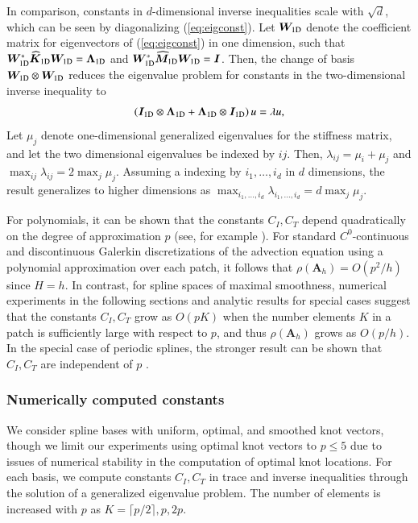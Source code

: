 \documentclass[preprint,10pt]{elsarticle}
\newcommand{\LRp}[1]{\left( #1 \right)}
\newcommand{\reviewerOne}[1]{#1}
\begin{document}
In comparison, constants in $d$-dimensional inverse inequalities scale with $\sqrt{d}$, which can be seen by diagonalizing (\ref{eq:eigconst}).  Let $\bm{W}_{\rm 1D}$ denote the coefficient matrix for eigenvectors of (\ref{eq:eigconst}) in one dimension, such that $\bm{W}_{\rm 1D}^* \widehat{\bm{K}}_{\rm 1D} \bm{W}_{\rm 1D} = \bm{\Lambda}_{\rm 1D}$ and $\bm{W}_{\rm 1D}^* \widehat{\bm{M}}_{\rm 1D} \bm{W}_{\rm 1D} = \bm{I}$.  Then, the change of basis $\bm{W}_{\rm 1D}\otimes \bm{W}_{\rm 1D}$ reduces the eigenvalue problem for constants in the two-dimensional inverse inequality to 
\[
\LRp{\bm{I}_{\rm 1D}\otimes \bm{\Lambda}_{\rm 1D} + \bm{\Lambda}_{\rm 1D}\otimes\bm{I}_{\rm 1D}} u = \lambda u,
\]
Let $\mu_j$ denote one-dimensional generalized eigenvalues for the stiffness matrix, and let the two dimensional eigenvalues be indexed by $ij$.  Then, $\lambda_{ij} = \mu_i + \mu_j$ and $\max_{ij} \lambda_{ij} = 2\max_j \mu_j$.  Assuming a indexing by $i_1, \ldots, i_d$ in $d$ dimensions, the result generalizes to higher dimensions as $\max_{i_1,\ldots,i_d} \lambda_{i_1,\ldots,i_d} = d\max_j \mu_j$.  

For polynomials, it can be shown that the constants $C_I,C_T$ depend quadratically on the degree of approximation $p$ (see, for example \cite{warburton2003constants, ozisik2010constants,hillewaert2011sharp}).  For standard $C^0$-continuous {\color{forestgreen} and discontinuous Galerkin discretizations} of the advection equation {\color{forestgreen} using a polynomial approximation over each patch}, it follows that $\rho(\bm{A}_h) = O(p^2 / h)$ {\color{forestgreen} since $H = h$}.  {\color{forestgreen} In contrast, for spline spaces of maximal smoothness, numerical experiments in the following sections and analytic results for special cases \cite{takacs2016approximation} suggest that the constants $C_I, C_T$ grow as $O(pK)$ when the number elements $K$ in a patch is sufficiently large with respect to $p$, and thus $\rho(\bm{A}_h)$ grows as $O(p / h)$.}  In the special case of periodic splines, the stronger result can be shown that $C_I, C_T$ are independent of $p$ \cite{takacs2016approximation}.  

\subsubsection{Numerically computed constants}
\label{sec:numconsts}

We consider spline bases with uniform, optimal, and smoothed knot vectors, though we limit our experiments using optimal knot vectors to $p \leq 5$ due to issues of numerical stability \reviewerOne{in the computation of optimal knot locations}.  For each basis, we compute constants $C_I,C_T$ in trace and inverse inequalities through the solution of a generalized eigenvalue problem.  The number of elements is increased with $p$ as $K = \lceil p/2 \rceil, p, 2p$.  %
\end{document}
